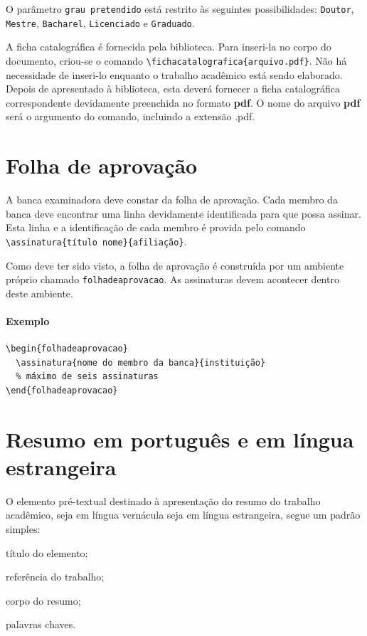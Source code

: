 \documentclass[a4paper,12pt,oneside,onecolumn,final,fleqn]{repUERJ}
\begin{document}
O parâmetro \texttt{grau pretendido} está restrito às seguintes possibilidades: \texttt{Doutor}, \texttt{Mestre}, \texttt{Bacharel}, \texttt{Licenciado} e \texttt{Graduado}.

A ficha catalográfica é fornecida pela biblioteca. Para inseri-la no corpo do documento, criou-se o comando \texttt{\textbackslash fichacatalografica\{arquivo.pdf\}}. Não há necessidade de inseri-lo enquanto o trabalho acadêmico está sendo elaborado. Depois de apresentado à biblioteca, esta deverá fornecer a ficha catalográfica correspondente devidamente preenchida no formato \textbf{pdf}. O nome do arquivo \textbf{pdf} será o argumento do comando, incluindo a extensão .pdf.

\section{Folha de aprovação}

A banca examinadora deve constar da folha de aprovação. Cada membro da banca deve encontrar uma linha devidamente identificada para que possa assinar. Esta linha e a identificação de cada membro é provida pelo comando \texttt{\textbackslash assinatura\{título nome\}\{afiliação\}}.

Como deve ter sido visto, a folha de aprovação é construída por um ambiente próprio chamado \texttt{folhadeaprovacao}. As assinaturas devem acontecer dentro deste ambiente.

\paragraph{Exemplo}

\begin{verbatim}
\begin{folhadeaprovacao}
  \assinatura{nome do membro da banca}{instituição}
  % máximo de seis assinaturas
\end{folhadeaprovacao}
\end{verbatim}

\section{Resumo em português e em língua estrangeira}

O elemento pré-textual destinado à apresentação do resumo do trabalho acadêmico, seja em língua vernácula seja em língua estrangeira, segue um padrão simples:
\begin{itemizacao}
\item título do elemento;
\item referência do trabalho;
\item corpo do resumo;
\item palavras chaves.
\end{itemizacao}
\end{document}
